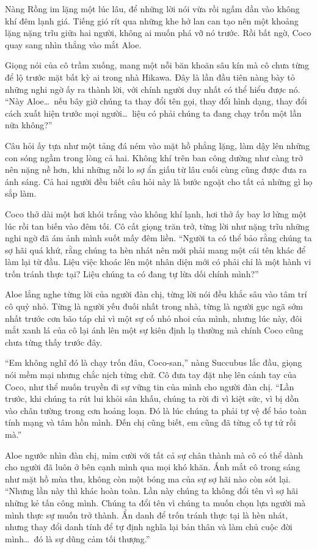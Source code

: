 ﻿\documentclass[../main.tex]{subfiles}
\begin{document}
Nàng Rồng im lặng một lúc lâu, để những lời nói vừa rồi ngấm dần vào không khí đêm lạnh giá. Tiếng gió rít qua những khe hở lan can tạo nên một khoảng lặng nặng trĩu giữa hai người, không ai muốn phá vỡ nó trước. Rồi bất ngờ, Coco quay sang nhìn thẳng vào mắt Aloe.

Giọng nói của cô trầm xuống, mang một nỗi băn khoăn sâu kín mà cô chưa từng để lộ trước mặt bất kỳ ai trong nhà Hikawa. Đây là lần đầu tiên nàng bày tỏ những nghi ngờ ấy ra thành lời, với chính người duy nhất có thể hiểu được nó. ``Này Aloe\dots\ nếu bây giờ chúng ta thay đổi tên gọi, thay đổi hình dạng, thay đổi cách xuất hiện trước mọi người\dots\ liệu có phải chúng ta đang chạy trốn một lần nữa không?''

Câu hỏi ấy tựa như một tảng đá ném vào mặt hồ phẳng lặng, làm dậy lên những con sóng ngầm trong lòng cả hai. Không khí trên ban công dường như càng trở nên nặng nề hơn, khi những nỗi lo sợ ẩn giấu từ lâu cuối cùng cũng được đưa ra ánh sáng. Cả hai người đều biết câu hỏi này là bước ngoặt cho tất cả những gì họ sắp làm.

Coco thở dài một hơi khói trắng vào không khí lạnh, hơi thở ấy bay lơ lửng một lúc rồi tan biến vào đêm tối. Cô cất giọng trăn trở, từng lời như nặng trĩu những nghi ngờ đã ám ảnh mình suốt mấy đêm liền. ``Người ta có thể bảo rằng chúng ta sợ hãi quá khứ, rằng chúng ta hèn nhát nên mới phải mang một cái tên khác để làm lại từ đầu. Liệu việc khoác lên một nhân diện mới có phải chỉ là một hành vi trốn tránh thực tại? Liệu chúng ta có đang tự lừa dối chính mình?''

Aloe lắng nghe từng lời của người đàn chị, từng lời nói đều khắc sâu vào tâm trí cô quỷ nhỏ. Từng là người yếu đuối nhất trong nhà, từng là người gục ngã sớm nhất trước cơn bão táp chỉ vì một sự cố nhỏ nhoi của mình, nhưng lúc này, đôi mắt xanh lá của cô lại ánh lên một sự kiên định lạ thường mà chính Coco cũng chưa từng thấy trước đây.

``Em không nghĩ đó là chạy trốn đâu, Coco-san,'' nàng Succubus lắc đầu, giọng nói mềm mại nhưng chắc nịch từng chữ. Cô đưa tay đặt nhẹ lên cánh tay của Coco, như thể muốn truyền đi sự vững tin của mình cho người đàn chị. ``Lần trước, khi chúng ta rút lui khỏi sân khấu, chúng ta rời đi vì kiệt sức, vì bị dồn vào chân tường trong cơn hoảng loạn. Đó là lúc chúng ta phải tự vệ để bảo toàn tính mạng và tâm hồn mình. Đến chị cũng biết, em cũng đã từng cố tự tử rồi mà.''

Aloe ngước nhìn đàn chị, mỉm cười với tất cả sự chân thành mà cô có thể dành cho người đã luôn ở bên cạnh mình qua mọi khó khăn. Ánh mắt cô trong sáng như mặt hồ mùa thu, không còn một bóng ma của sự sợ hãi nào còn sót lại. ``Nhưng lần này thì khác hoàn toàn. Lần này chúng ta không đổi tên vì sợ hãi những kẻ tấn công mình. Chúng ta đổi tên vì chúng ta muốn chọn lựa người mà mình thực sự muốn trở thành. Ẩn danh để trốn tránh thực tại là hèn nhát, nhưng thay đổi danh tính để tự định nghĩa lại bản thân và làm chủ cuộc đời mình\dots\ đó là sự dũng cảm tối thượng.''
\end{document}
